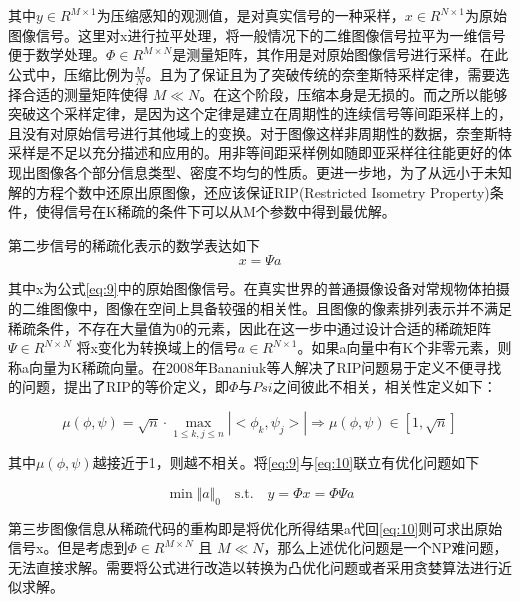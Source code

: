 其中$y \in R^{M \times 1}$为压缩感知的观测值，是对真实信号的一种采样，$x \in R^{N \times 1}$为原始图像信号。这里对x进行拉平处理，将一般情况下的二维图像信号拉平为一维信号便于数学处理。$\Phi \in R^{M \times N}$是测量矩阵，其作用是对原始图像信号进行采样。在此公式中，压缩比例为$\frac{M}{N}$。且为了保证且为了突破传统的奈奎斯特采样定律，需要选择合适的测量矩阵使得 $M \ll N$。在这个阶段，压缩本身是无损的。而之所以能够突破这个采样定律，是因为这个定律是建立在周期性的连续信号等间距采样上的，且没有对原始信号进行其他域上的变换。对于图像这样非周期性的数据，奈奎斯特采样是不足以充分描述和应用的。用非等间距采样例如随即亚采样往往能更好的体现出图像各个部分信息类型、密度不均匀的性质。更进一步地，为了从远小于未知解的方程个数中还原出原图像，还应该保证RIP(Restricted Isometry Property)\cite{The_restricted_isometry_property_and_its_implications_for_compressed_sensing}条件，使得信号在K稀疏的条件下可以从M个参数中得到最优解。

第二步信号的稀疏化表示的数学表达如下
\begin{equation}
  \label{eq:10}
  x = \Psi a
\end{equation}

其中x为公式\ref{eq:9}中的原始图像信号。在真实世界的普通摄像设备对常规物体拍摄的二维图像中，图像在空间上具备较强的相关性。且图像的像素排列表示并不满足稀疏条件，不存在大量值为0的元素，因此在这一步中通过设计合适的稀疏矩阵$\Psi \in R^{N \times N}$
将x变化为转换域上的信号$a \in R^{N \times 1}$。如果a向量中有K个非零元素，则称a向量为K稀疏向量。在2008年Bananiuk等人\cite{Compressive_sensing_[Lecture_Notes]}解决了RIP问题易于定义不便寻找的问题，提出了RIP的等价定义，即$\Phi$与$Psi$之间彼此不相关，相关性定义如下：

\begin{equation}
  \label{eq:11}
  \mu(\phi, \psi) = \sqrt{n} \cdot \mathop{\max}_{1 \leq k,j \leq n} |<\phi_k,\psi_j>| \Rightarrow \mu(\phi, \psi) \in \left[ 1,\sqrt{n}  \right]
\end{equation}

其中$\mu(\phi, \psi)$越接近于1，则越不相关。将\ref{eq:9}与\ref{eq:10}联立有优化问题如下

\begin{equation}
  \label{eq:12}
  \min \Vert a \Vert_0 \quad \text{s.t.} \quad y = \Phi x = \Phi \Psi a
\end{equation}

第三步图像信息从稀疏代码的重构即是将优化所得结果a代回\ref{eq:10}则可求出原始信号x。但是考虑到$\Phi \in R^{M \times N}$ 且  $M \ll N$，那么上述优化问题是一个NP难问题，无法直接求解。需要将公式进行改造以转换为凸优化问题或者采用贪婪算法进行近似求解。

